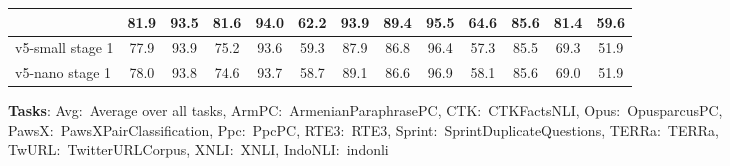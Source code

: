 \documentclass[11pt]{article}
\begin{document}
\begin{table}[H]
\begin{tabular}{l*{12}{c}}
\textbf{\JEmbeddingVFiveTextNanoShort{}} & \textbf{81.9} & 93.5 & \textbf{81.6} & \textbf{94.0} & 62.2 & \textbf{93.9} & 89.4 & 95.5 & 64.6 & 85.6 & 81.4 & 59.6 \\
\midrule
v5-small stage 1 & 77.9 & 93.9 & 75.2 & 93.6 & 59.3 & 87.9 & 86.8 & 96.4 & 57.3 & 85.5 & 69.3 & 51.9 \\
v5-nano stage 1 & 78.0 & 93.8 & 74.6 & 93.7 & 58.7 & 89.1 & 86.6 & 96.9 & 58.1 & 85.6 & 69.0 & 51.9 \\
\bottomrule
\end{tabular}
\begin{flushleft}
\textbf{Tasks}: Avg:~Average over all tasks, ArmPC:~ArmenianParaphrasePC, CTK:~CTKFactsNLI, Opus:~OpusparcusPC, PawsX:~PawsXPairClassification, Ppc:~PpcPC, RTE3:~RTE3, Sprint:~SprintDuplicateQuestions, TERRa:~TERRa, TwURL:~TwitterURLCorpus, XNLI:~XNLI, IndoNLI:~indonli
\end{flushleft}
\end{table}
\end{document}
